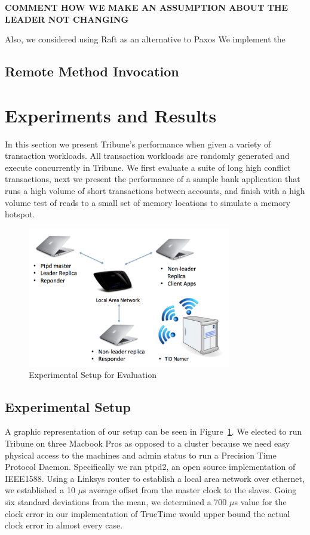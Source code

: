 \documentclass[10pt,twocolumn]{article}
\begin{document}
\textbf{COMMENT HOW WE MAKE AN ASSUMPTION ABOUT THE LEADER NOT CHANGING}  
  
Also, we considered using Raft \cite{ongaro_search_2014} as an alternative to Paxos
We implement the 

\subsection{Remote Method Invocation}

\section{Experiments and Results}

In this section we present Tribune's performance when given a variety of transaction workloads. All transaction workloads are randomly generated and execute concurrently in Tribune. We first evaluate a suite of long high conflict transactions, next we present the performance of a sample bank application that runs a high volume of short transactions between accounts, and finish with a high volume test of reads to a small set of memory locations to simulate a memory hotspot. 

\begin{figure}[!b]
  \begin{center}
    \includegraphics[width=3.5in]{Images/test-setup.png}
  \end{center}

  \caption{\small Experimental Setup for Evaluation }
  \label{test-setup}
\end{figure}

\subsection{Experimental Setup}

A graphic representation of our setup can be seen in Figure~\ref{test-setup}. We elected to run Tribune on three Macbook Pros as opposed to a cluster because we need easy physical access to the machines and admin status to run a Precision Time Protocol Daemon. Specifically we ran ptpd2, an open source implementation of IEEE1588. Using a Linksys router to establish a local area network over ethernet, we established a 10 $\mu$s average offset from the master clock to the slaves. Going six standard deviations from the mean, we determined a 700 $\mu$s value for the clock error in our implementation of TrueTime would upper bound the actual clock error in almost every case.
\end{document}
